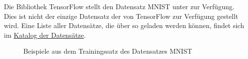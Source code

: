 Die Bibliothek TensorFlow stellt den Datensatz MNIST unter  zur Verfügung. Dies ist nicht der einzige Datensatz der von TensorFlow zur Verfügung gestellt wird. Eine Liste aller Datensätze, die über so geladen werden können, findet sich im \href{https://www.tensorflow.org/datasets/catalog/overview#all_datasets}{Katalog der Datensätze}.


\begin{figure}
    \caption{Beispiele aus dem Trainingssatz des Datensatzes MNIST \cite{Siddique:2019}}
\end{figure}

